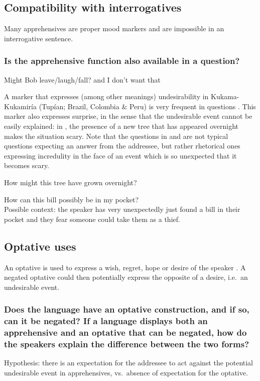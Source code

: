 \documentclass[output=paper,colorlinks,citecolor=brown]{langscibook}
\begin{document}
\subsection{Compatibility with interrogatives}
\label{subsec:apprinterrogatives}

Many apprehensives are proper mood markers and are impossible in an interrogative sentence.

\subsubsection{Is the apprehensive function also available in a question?}
\label{1.8.1}

\ea \label{p34} Might Bob leave\textnormal{/}laugh\textnormal{/}fall? {\op}\textnormal{and I don't want that}{\cp}
\z

A marker that expresses (among other meanings) undesirability in Kukama-Kukamiría (Tupían; Brazil, Colombia \& Peru) is very frequent in questions \citep[415--417]{Vallejosyopán2016}. This marker also expresses surprise, in the sense that the undesirable event cannot be easily explained: in , the presence of a new tree that has appeared overnight makes the situation scary. Note that the questions in  and  are not typical questions expecting an answer from the addressee, but rather rhetorical ones expressing incredulity in the face of an event which is so unexpected that it becomes scary.

\ea \label{p35} How might this tree have grown overnight?
\z

\ea \label{p36} How can this bill possibly be in my pocket? \\
\textnormal{Possible context: the speaker has very unexpectedly just found a bill in their pocket and they fear someone could take them as a thief.}
\z



\subsection{Optative uses}
\label{subsec:approptative}

An optative is used to express a wish, regret, hope or desire of the speaker \citep{Grosz2012,dobrushinaetal2013}. A negated optative could then potentially express the opposite of a desire, i.e.\ an undesirable event.

\subsubsection{Does the language have an optative construction, and if so, can it be negated?
If a language displays both an apprehensive and an optative that can be negated, how do the speakers explain the difference between the two forms?} Hypothesis: there is an expectation for the addressee to act against the potential undesirable event in apprehensives, vs.\ absence of expectation for the optative.
\label{1.9.1}
\end{document}
